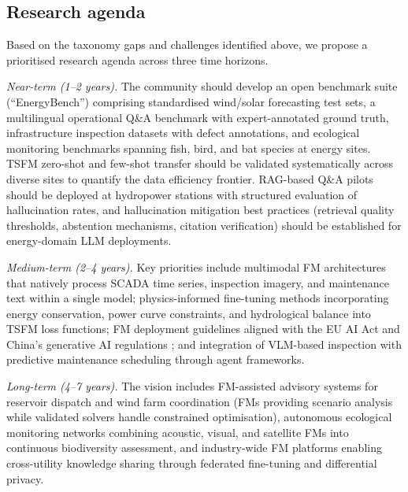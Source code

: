\documentclass[preprint,12pt]{elsarticle}
\begin{document}
\subsection{Research agenda}
\label{subsec:research_agenda}

Based on the taxonomy gaps and challenges identified above, we propose a prioritised research agenda across three time horizons.

\textit{Near-term (1--2 years).} The community should develop an open benchmark suite (``EnergyBench'') comprising standardised wind/solar forecasting test sets, a multilingual operational Q\&A benchmark with expert-annotated ground truth, infrastructure inspection datasets with defect annotations, and ecological monitoring benchmarks spanning fish, bird, and bat species at energy sites. TSFM zero-shot and few-shot transfer should be validated systematically across diverse sites to quantify the data efficiency frontier. RAG-based Q\&A pilots should be deployed at hydropower stations with structured evaluation of hallucination rates, and hallucination mitigation best practices (retrieval quality thresholds, abstention mechanisms, citation verification) should be established for energy-domain LLM deployments.

\textit{Medium-term (2--4 years).} Key priorities include multimodal FM architectures that natively process SCADA time series, inspection imagery, and maintenance text within a single model; physics-informed fine-tuning methods incorporating energy conservation, power curve constraints, and hydrological balance into TSFM loss functions; FM deployment guidelines aligned with the EU AI Act \cite{euaiact2024} and China's generative AI regulations \cite{china_genai_regulation2023}; and integration of VLM-based inspection with predictive maintenance scheduling through agent frameworks.

\textit{Long-term (4--7 years).} The vision includes FM-assisted advisory systems for reservoir dispatch and wind farm coordination (FMs providing scenario analysis while validated solvers handle constrained optimisation), autonomous ecological monitoring networks combining acoustic, visual, and satellite FMs into continuous biodiversity assessment, and industry-wide FM platforms enabling cross-utility knowledge sharing through federated fine-tuning and differential privacy.

\end{document}
